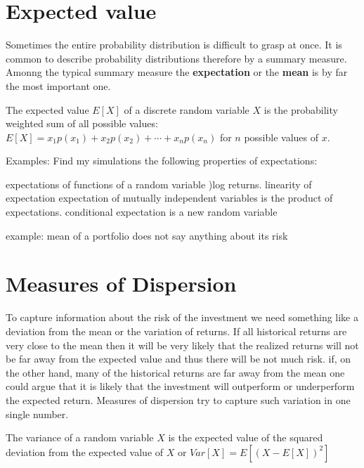 \documentclass[
]{book}
\providecommand{\tightlist}{%
  \setlength{\itemsep}{0pt}\setlength{\parskip}{0pt}}
\begin{document}
\hypertarget{expected-value}{%
\section{Expected value}\label{expected-value}}

Sometimes the entire probability distribution is difficult to grasp at once. It is common to
describe probability distributions therefore by a summary measure. Amonng the typical summary
measure the \textbf{expectation} or the \textbf{mean} is by far the most important one.

\begin{description}
\tightlist
\item[Expected Value]
The expected value \(E[X]\) of a discrete random variable \(X\) is the probability weighted sum of
all possible values: \(E[X] = x_1p(x_1) + x_2 p(x_2) + \cdots + x_n p(x_n)\) for \(n\) possible
values of \(x\).
\end{description}

Examples: Find my simulations the following properties of expectations:

expectations of functions of a random variable )log returns.
linearity of expectation
expectation of mutually independent variables is the product of expectations.
conditional expectation is a new random variable

example: mean of a portfolio does not say anything about its risk

\hypertarget{measures-of-dispersion}{%
\section{Measures of Dispersion}\label{measures-of-dispersion}}

To capture information about the risk of the investment we need something like a deviation from
the mean or the variation of returns. If all historical returns are very close to the mean then
it will be very likely that the realized returns will not be far away from the expected value and
thus there will be not much risk. if, on the other hand, many of the historical returns are
far away from the mean one could argue that it is likely that the investment will outperform or
underperform the expected return. Measures of dispersion try to capture such variation in
one single number.

\begin{description}
\tightlist
\item[Variance]
The variance of a random variable \(X\) is the expected value of the squared deviation
from the expected value of \(X\) or
\(Var[X] = E[(X -E[X])^2]\)
\end{description}
\end{document}
